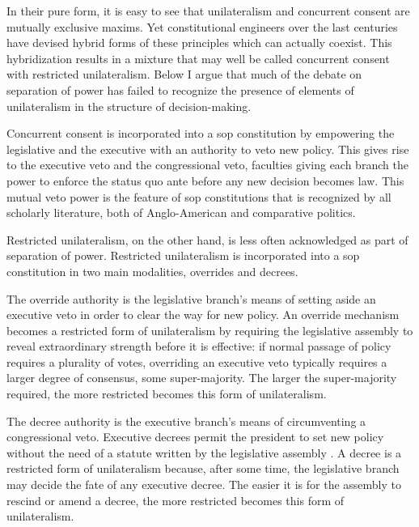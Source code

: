 In their pure form, it is easy to see that unilateralism and concurrent consent are mutually exclusive maxims.  Yet constitutional engineers over the last centuries have devised hybrid forms of these principles which can actually coexist.  This hybridization results in a mixture that may well be called concurrent consent with restricted unilateralism.  Below I argue that much of the debate on separation of power has failed to recognize the presence of elements of unilateralism in the structure of decision-making.  

Concurrent consent is incorporated into a sop constitution by empowering the legislative and the executive with an authority to veto new policy.  This gives rise to the executive veto and the congressional veto, faculties giving each branch the power to enforce the status quo ante before any new decision becomes law.  This mutual veto power is the feature of sop constitutions that is recognized by all scholarly literature, both of Anglo-American and comparative politics.  

Restricted unilateralism, on the other hand, is less often acknowledged as part of separation of power.  Restricted unilateralism is incorporated into a sop constitution in two main modalities, overrides and decrees.  

The override authority is the legislative branch’s means of setting aside an executive veto in order to clear the way for new policy.  An override mechanism becomes a restricted form of unilateralism by requiring the legislative assembly to reveal extraordinary strength before it is effective: if normal passage of policy requires a plurality of votes, overriding an executive veto typically requires a larger degree of consensus, some super-majority.  The larger the super-majority required, the more restricted becomes this form of unilateralism.  

The decree authority is the executive branch’s means of circumventing a congressional veto.  Executive decrees permit the president to set new policy without the need of a statute written by the legislative assembly \citep[9]{carey.shugart.1998}.  A decree is a restricted form of unilateralism because, after some time, the legislative branch may decide the fate of any executive decree.  The easier it is for the assembly to rescind or amend a decree, the more restricted becomes this form of unilateralism.  

